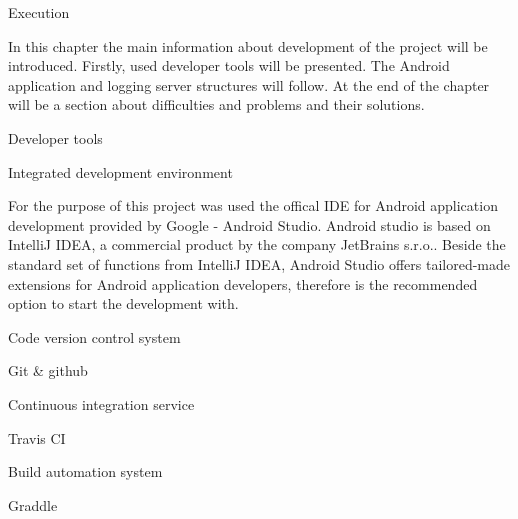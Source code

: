 \chap Execution

In this chapter the main information about development of the project will be introduced. Firstly, used developer tools will be presented. The Android application and logging server structures will follow. At the end of the chapter will be a section about difficulties and problems and their solutions. 

\sec Developer tools



\secc Integrated development environment

For the purpose of this project was used the offical IDE for Android application development provided by Google - Android Studio. Android studio is based on IntelliJ IDEA, a commercial product
by the company JetBrains s.r.o.. Beside the standard set of functions from IntelliJ IDEA, Android Studio offers tailored-made extensions for Android application developers, therefore is the recommended option to start the development with.

\secc Code version control system

Git \& github

\secc Continuous integration service

Travis CI

\secc Build automation system

Graddle

